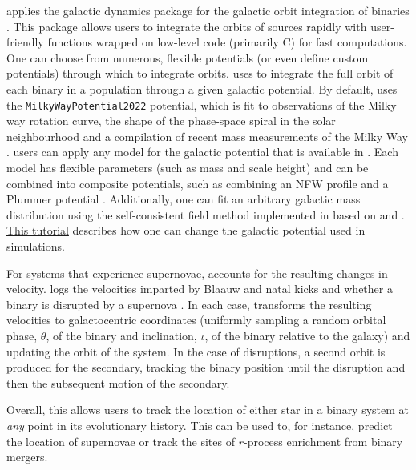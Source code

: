 \documentclass[twocolumn, twocolappendix, oneside]{aastex631}
\newcommand{\tutorialLink}[2]{\href{#1}{{\color{codecolour}#2}}}
\newcommand{\invisibleedit}[1]{#1}
\begin{document}
\cogsworth applies the galactic dynamics package \gala{} for the galactic orbit integration of binaries \citep{Gala}. This package allows users to integrate the orbits of sources rapidly with user-friendly functions wrapped on low-level code (primarily C) for fast computations. One can choose from numerous, flexible potentials (or even define custom potentials) through which to integrate orbits. \cogsworth uses \gala to integrate the full orbit of each binary in a population through a given galactic potential. By default, \cogsworth uses the \texttt{MilkyWayPotential2022} potential, which is fit to observations of the Milky way rotation curve, the shape of the phase-space spiral in the solar neighbourhood and a compilation of recent mass measurements of the Milky Way \citep{Eilers+2019:2019ApJ...871..120E, Darragh-Ford+2023:2023ApJ...955...74D}. \invisibleedit{\cogsworth users can apply any model for the galactic potential that is available in \gala. Each model has flexible parameters (such as mass and scale height) and can be combined into composite potentials, such as combining an NFW profile \citep{Navarro+1997:1997ApJ...490..493N} and a Plummer potential \citep{Plummer+1911:1911MNRAS..71..460P}. Additionally, one can fit an arbitrary galactic mass distribution using the self-consistent field method implemented in \gala based on \citet{Hernquist+1992:1992ApJ...386..375H} and \citet{Lowing+2011:2011MNRAS.416.2697L}. \tutorialLink{https://cogsworth.readthedocs.io/en/latest/tutorials/observables/photometry.html}{This tutorial} describes how one can change the galactic potential used in \cogsworth simulations.}

For systems that experience supernovae, \cogsworth accounts for the resulting changes in velocity. \cosmic logs the velocities imparted by Blaauw \citep{Blaauw+1961} and natal kicks \citep{Katz+1975:1975Natur.253..698K,Janka+2012:2012ARNPS..62..407J,Janka+2017:2017ApJ...837...84J} and whether a binary is disrupted by a supernova \citep[e.g.,][]{Renzo+2019:2019A&A...624A..66R}. In each case, \cogsworth transforms the resulting velocities to galactocentric coordinates (uniformly sampling a random orbital phase, $\theta$, of the binary and inclination, $\iota$, of the binary relative to the galaxy) and updating the orbit of the system. In the case of disruptions, a second orbit is produced for the secondary, tracking the binary position until the disruption and then the subsequent motion of the secondary.

Overall, this allows users to track the location of either star in a binary system at \textit{any} point in its evolutionary history. This can be used to, for instance, predict the location of supernovae or track the sites of $r$-process enrichment from binary mergers.
\end{document}
